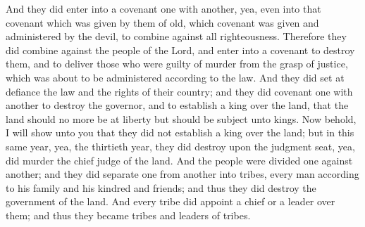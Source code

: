 And they did enter into a covenant one with another, yea, even into that covenant which was given by them of old, which covenant was given and administered by the devil, to combine against all righteousness.
\bverse \iffalse Therefore they did combine against the people of the Lord, and enter into a covenant to destroy them, and to deliver those who were guilty of murder from the grasp of justice, which was about to be administered according to the law. \fi
Therefore they did combine against the people of the Lord, and enter into a covenant to destroy them, and to deliver those who were guilty of murder from the grasp of justice, which was about to be administered according to the law.
\bverse \iffalse And they did set at defiance the law and the rights of their country; and they did covenant one with another to destroy the governor, and to establish a king over the land, that the land should no more be at liberty but should be subject unto kings. \fi
And they did set at defiance the law and the rights of their country; and they did covenant one with another to destroy the governor, and to establish a king over the land, that the land should no more be at liberty but should be subject unto kings.
\bchapter
\bverse \iffalse Now behold, I will show unto you that they did not establish a king over the land; but in this same year, yea, the thirtieth year, they did destroy upon the judgment seat, yea, did murder the chief judge of the land. \fi
Now behold, I will show unto you that they did not establish a king over the land; but in this same year, yea, the thirtieth year, they did destroy upon the judgment seat, yea, did murder the chief judge of the land.
\bverse \iffalse And the people were divided one against another; and they did separate one from another into tribes, every man according to his family and his kindred and friends; and thus they did destroy the government of the land. \fi
And the people were divided one against another; and they did separate one from another into tribes, every man according to his family and his kindred and friends; and thus they did destroy the government of the land.
\bverse \iffalse And every tribe did appoint a chief or a leader over them; and thus they became tribes and leaders of tribes. \fi
And every tribe did appoint a chief or a leader over them; and thus they became tribes and leaders of tribes.
\bverse \iffalse Now behold, there was no man among them save he had much family and many kindreds and friends; therefore their tribes became exceedingly great. \fi
